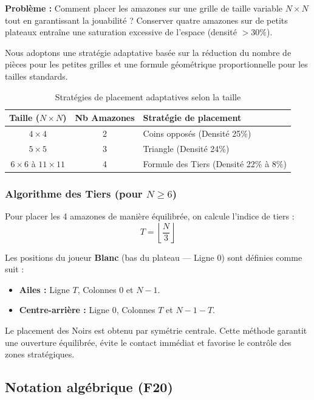 \documentclass[a4paper]{article}
\begin{document}
\textbf{Problème :} Comment placer les amazones sur une grille de taille variable $N \times N$ tout en garantissant la jouabilité ? Conserver quatre amazones sur de petits plateaux entraîne une saturation excessive de l’espace (densité $> 30\%$).

Nous adoptons une stratégie adaptative basée sur la réduction du nombre de pièces pour les petites grilles et une formule géométrique proportionnelle pour les tailles standards.

\begin{table}[H]
\centering
\begin{tabular}{ccl}
\toprule
\textbf{Taille ($N \times N$)} & \textbf{Nb Amazones} & \textbf{Stratégie de placement} \\
\midrule
$4 \times 4$ & 2 & Coins opposés (Densité 25\%) \\
$5 \times 5$ & 3 & Triangle (Densité 24\%) \\
$6 \times 6$ à $11 \times 11$ & 4 & Formule des Tiers (Densité 22\% à 8\%) \\
\bottomrule
\end{tabular}
\caption{Stratégies de placement adaptatives selon la taille}
\end{table}

\subsubsection{Algorithme des Tiers (pour $N \geq 6$)}

Pour placer les 4 amazones de manière équilibrée, on calcule l’indice de tiers :
\[
T = \left\lfloor \frac{N}{3} \right\rfloor
\]

Les positions du joueur \textbf{Blanc} (bas du plateau — Ligne 0) sont définies comme suit :
\begin{itemize}
    \item \textbf{Ailes :} Ligne $T$, Colonnes $0$ et $N-1$.
    \item \textbf{Centre-arrière :} Ligne $0$, Colonnes $T$ et $N-1-T$.
\end{itemize}

Le placement des Noirs est obtenu par symétrie centrale. Cette méthode garantit une ouverture équilibrée, évite le contact immédiat et favorise le contrôle des zones stratégiques.

\subsection{Notation algébrique (F20)}
\end{document}
